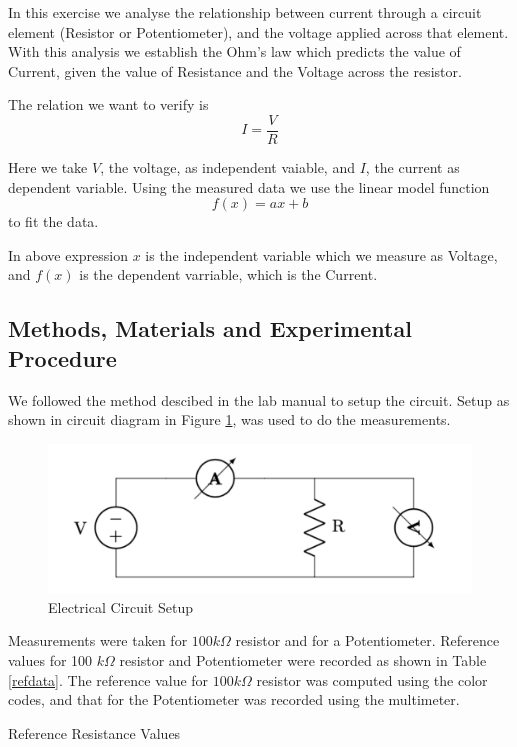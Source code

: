 \documentclass[letterpaper,12pt]{article}
\begin{document}
In this exercise we analyse the relationship between current through a circuit element (Resistor or Potentiometer), and the voltage applied across that element. 
With this analysis we establish the Ohm's law which predicts the value of Current, given the value of Resistance and the 
Voltage across the resistor.

The relation we want to verify is $$I = \frac{V}{R}$$

Here we take $V$, the voltage, as independent vaiable, and $I$, the current as dependent variable. Using the measured data
we use the linear model function $$f(x) = ax + b$$ to fit the data. 

In above expression $x$ is the independent variable which we measure as Voltage, and $f(x)$ is the dependent varriable, which is 
the Current.

\subsection{Methods, Materials and Experimental Procedure}

We followed the method descibed in the lab manual\cite{lab-manual-ex1} to setup the circuit. Setup as shown in circuit
diagram in Figure \ref{setup}, was used to do the measurements.

\begin{figure}[H]
  \centering
  \includegraphics[width=0.9\linewidth]{../Exercise1/lab_1_ex_1_setup.png}    
  \caption{Electrical Circuit Setup}
  \label{setup}
\end{figure}

Measurements were taken for $100 k\Omega$ resistor and for a Potentiometer. Reference values
for 100 $k\Omega$ resistor and Potentiometer were recorded as shown in Table \ref{refdata}. The reference value
for $100 k\Omega$ resistor was computed using the color codes, and that for the Potentiometer 
was recorded using the multimeter.

\begin{table}[H]
  \centering
  \caption{Reference Resistance Values}
  \label{refdata}
\end{table}
\end{document}
